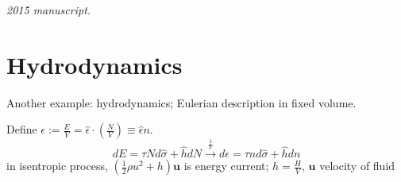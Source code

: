 \noindent\textit{2015 manuscript.}

\section{Hydrodynamics}

Another example: hydrodynamics; Eulerian description in fixed volume.  

Define $\epsilon := \frac{ E}{V} = \widehat{\epsilon} \cdot \left( \frac{N}{V} \right) \equiv \widehat{\epsilon} n$.  
\[
dE = \tau N d\widehat{\sigma} + \widehat{h} dN \xrightarrow{ \frac{1}{V} } d\epsilon = \tau n d\widehat{\sigma} + \widehat{h} dn 
\]
in isentropic process, $\left( \frac{1}{2} \rho u^2 + h \right) \mathbf{u}$ is energy current; $h= \frac{H}{V}$, $\mathbf{u}$ velocity of fluid




